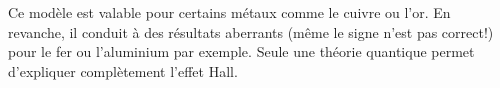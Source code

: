 \documentclass[12pt,fancy]{cours}%
\begin{document}
  \begin{remarque}
    Ce modèle est valable pour certains métaux comme le cuivre ou l'or. En revanche, il conduit à des résultats aberrants (même le signe n'est pas correct!) pour le fer ou l'aluminium par exemple. Seule une théorie quantique permet d'expliquer complètement l'effet Hall.
  \end{remarque}
%
%
\end{document}

